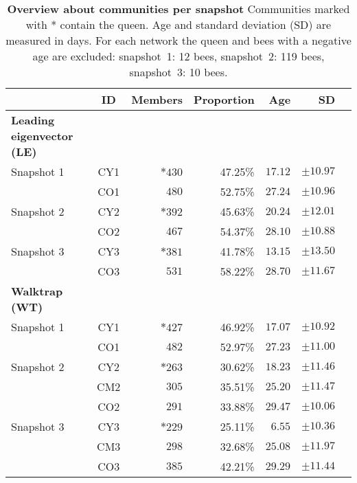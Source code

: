 \begin{table}
\small
\centering
\caption[Overview about communities]{\textbf{Overview about communities per snapshot} Communities marked with * contain the queen. Age and standard deviation (SD) are measured in days. For each network the queen and bees with a negative age are excluded: snapshot~1: 12 bees, snapshot~2: 119 bees, snapshot~3: 10 bees.}
\label{tab:communities}
\vspace*{5mm}
\begin{tabular}{lcrrrrr}
	\toprule
	{}  & ID & Members & Proportion & Age & SD\\
	\midrule

	\textbf{Leading eigenvector (LE)} &&&&&\\
	\midrule 
	Snapshot 1  & CY1 & $*430$  & 47.25\% & $17.12$ & $\pm10.97$ \\
	                 & CO1 & $480$   & 52.75\% & $27.24$ & $\pm10.96$ \\
	\midrule   							
	Snapshot 2  & CY2 & $*392$  & 45.63\% & $20.24$ & $\pm12.01$ \\
	                 & CO2 & $467$   & 54.37\% & $28.10$ & $\pm10.88$ \\
	\midrule  
	Snapshot 3  & CY3 & $*381$  & 41.78\% & $13.15$ & $\pm13.50$ \\
	                 & CO3 & $531$   & 58.22\% & $28.70$ & $\pm11.67$ \\
    \midrule

    \textbf{Walktrap (WT)} &&&&&\\
    \midrule 
	Snapshot 1 & CY1 & $*427$ & 46.92\% & $17.07$ & $\pm10.92$\\
	                & CO1 & $482$  & 52.97\% & $27.23$ & $\pm11.00$\\
	\midrule
	Snapshot 2 & CY2 & $*263$ & 30.62\% & $18.23$ & $\pm11.46$\\
				    & CM2 & $305$  & 35.51\% & $25.20$ & $\pm11.47$\\
				    & CO2 & $291$  & 33.88\% & $29.47$ & $\pm10.06$\\            
	\midrule
	Snapshot 3 & CY3 & $*229$  & 25.11\% & $6.55$  & $\pm10.36$\\
					& CM3 & $298$  & 32.68\% & $25.08$ & $\pm11.97$\\
					& CO3 & $385$  & 42.21\% & $29.29$ & $\pm11.44$\\
	\bottomrule
\end{tabular}
\end{table}